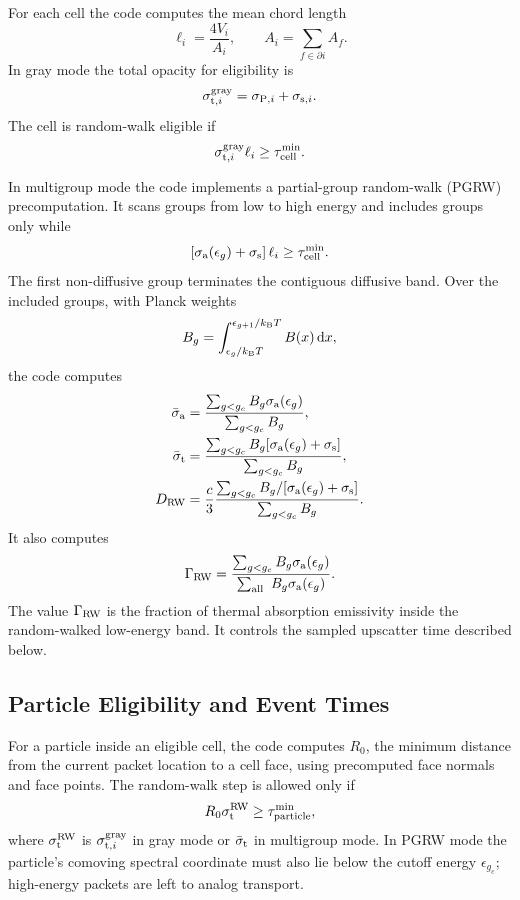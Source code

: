 \documentclass[11pt]{article}
\newcommand{\sigA}{\sigma_{\rm a}}
\newcommand{\sigS}{\sigma_{\rm s}}
\newcommand{\sigT}{\sigma_{\rm t}}
\newcommand{\dd}{\mathrm{d}}
\begin{document}
For each cell the code computes the mean chord length
\begin{equation}
  \ell_i = \frac{4V_i}{A_i},
  \qquad
  A_i = \sum_{f\in\partial i} A_f.
\end{equation}
In gray mode the total opacity for eligibility is
\begin{equation}
  \sigma_{{\rm t},i}^{\rm gray} = \sigma_{{\rm P},i} + \sigma_{{\rm s},i}.
\end{equation}
The cell is random-walk eligible if
\begin{equation}
  \sigma_{{\rm t},i}^{\rm gray}\ell_i
  \ge
  \tau_{\rm cell}^{\rm min}.
\end{equation}

In multigroup mode the code implements a partial-group random-walk (PGRW)
precomputation. It scans groups from low to high energy and includes groups
only while
\begin{equation}
  \left[\sigA(\epsilon_g)+\sigS\right]\ell_i
  \ge
  \tau_{\rm cell}^{\rm min}.
\end{equation}
The first non-diffusive group terminates the contiguous diffusive band. Over
the included groups, with Planck weights
\[
  B_g =
  \int_{\epsilon_g/k_{\rm B}T}^{\epsilon_{g+1}/k_{\rm B}T}
  B(x)\,\dd x,
\]
the code computes
\begin{align}
  \bar{\sigma}_{\rm a}
  &=
  \frac{\sum_{g<g_c} B_g\sigA(\epsilon_g)}
       {\sum_{g<g_c} B_g},\\
  \bar{\sigma}_{\rm t}
  &=
  \frac{\sum_{g<g_c} B_g[\sigA(\epsilon_g)+\sigS]}
       {\sum_{g<g_c} B_g},\\
  D_{\rm RW}
  &=
  \frac{c}{3}
  \frac{\sum_{g<g_c} B_g/[\sigA(\epsilon_g)+\sigS]}
       {\sum_{g<g_c} B_g}.
  \label{eq:pgrw-diffusion}
\end{align}
It also computes
\begin{equation}
  \Gamma_{\rm RW}
  =
  \frac{\sum_{g<g_c} B_g\sigA(\epsilon_g)}
       {\sum_{\rm all\ } B_g\sigA(\epsilon_g)}.
  \label{eq:pgrw-gamma}
\end{equation}
The value \(\Gamma_{\rm RW}\) is the fraction of thermal absorption emissivity
inside the random-walked low-energy band. It controls the sampled upscatter
time described below.

\subsection{Particle Eligibility and Event Times}

For a particle inside an eligible cell, the code computes \(R_0\), the minimum
distance from the current packet location to a cell face, using precomputed
face normals and face points. The random-walk step is allowed only if
\begin{equation}
  R_0\sigT^{\rm RW}
  \ge
  \tau_{\rm particle}^{\rm min},
  \label{eq:rw-particle-threshold}
\end{equation}
where \(\sigT^{\rm RW}\) is \(\sigma_{{\rm t},i}^{\rm gray}\) in gray mode or
\(\bar{\sigma}_{\rm t}\) in multigroup mode. In PGRW mode the particle's
comoving spectral coordinate must also lie below the cutoff energy
\(\epsilon_{g_c}\); high-energy packets are left to analog transport.
\end{document}
